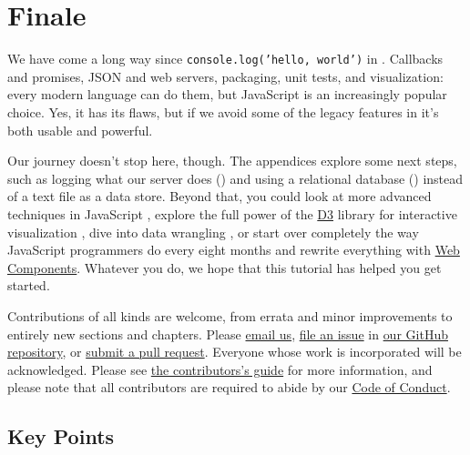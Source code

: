 \chapter{Finale}\label{s:finale}

We have come a long way since \texttt{console.log('hello,\ world')} in .
Callbacks and promises,
JSON and web servers,
packaging, unit tests, and visualization:
every modern language can do them,
but JavaScript is an increasingly popular choice.
Yes,
it has its flaws,
but if we avoid some of the legacy features in 
it's both usable and powerful.

Our journey doesn't stop here, though.
The appendices explore some next steps,
such as logging what our server does ()
and using a relational database () instead of a text file
as a data store.
Beyond that,
you could look at more advanced techniques in JavaScript \cite{Have2018},
explore the full power of the \href{https://d3js.org/}{D3} library for interactive visualization \cite{Meek2017},
dive into data wrangling \cite{Davi2018},
or start over completely the way JavaScript programmers do every eight months
and rewrite everything with \href{https://developer.mozilla.org/en-US/docs/Web/Web_Components}{Web Components}.
Whatever you do,
we hope that this tutorial has helped you get started.

Contributions of all kinds are welcome,
from errata and minor improvements to entirely new sections and chapters.
Please \href{mailto:gvwilson@third-bit.com}{email us},
\href{https://github.com/software-tools-in-javascript/js-vs-ds/issues}{file an issue} in \href{https://github.com/software-tools-in-javascript/js-vs-ds/}{our GitHub repository},
or \href{https://github.com/software-tools-in-javascript/js-vs-ds/pulls}{submit a pull request}.
Everyone whose work is incorporated will be acknowledged.
Please see \href{/en/contributing/}{the contributors's guide} for more information,
and please note that all contributors are required to abide by
our \href{/en/conduct/}{Code of Conduct}.

\section*{Key Points}


